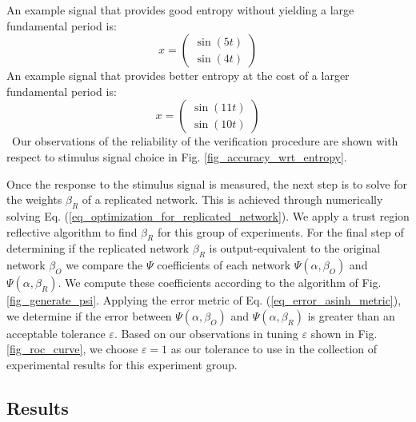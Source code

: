 An example signal that provides good entropy without yielding a large fundamental period is:
\begin{equation}
	x = \begin{pmatrix}
		\sin(5t) \\
		\sin(4t)
	\end{pmatrix}
	\label{eq_stimulus_5_4}
\end{equation}
An example signal that provides better entropy at the cost of a larger fundamental period is:
\begin{equation}
	x = \begin{pmatrix}
		\sin(11t) \\
		\sin(10t)
	\end{pmatrix}
	\label{eq_stimulus_11_10}
\end{equation}\
Our observations of the reliability of the verification procedure are shown with respect to stimulus signal choice in Fig. \ref{fig_accuracy_wrt_entropy}.

Once the response to the stimulus signal is measured, the next step is to solve for the weights $\beta_R$ of a replicated network.  This is achieved through numerically solving Eq. (\ref{eq_optimization_for_replicated_network}).  We apply a trust region reflective algorithm to find $\beta_R$ for this group of experiments.
For the final step of determining if the replicated network $\beta_R$ is output-equivalent to the original network $\beta_O$ we compare the $\Psi$ coefficients of each network $\Psi(\alpha, \beta_O)$ and $\Psi(\alpha, \beta_R)$.  We compute these coefficients according to the algorithm of Fig. \ref{fig_generate_psi}.  Applying the error metric of Eq. (\ref{eq_error_asinh_metric}), we determine if the error between $\Psi(\alpha, \beta_O)$ and $\Psi(\alpha, \beta_R)$ is greater than an acceptable tolerance $\varepsilon$.  Based on our observations in tuning $\varepsilon$ shown in Fig. \ref{fig_roc_curve}, we choose $\varepsilon = 1$ as our tolerance to use in the collection of experimental results for this experiment group.

\subsection{Results}
